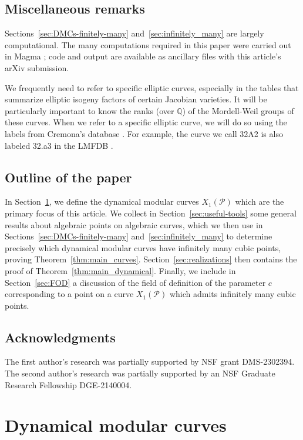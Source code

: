 \documentclass[12pt]{amsart}
\theoremstyle{definition}
\newcommand{\bbQ}{\mathbb{Q}}
\newcommand{\calP}{\mathcal{P}}
\numberwithin{equation}{section}
\begin{document}
\subsection{Miscellaneous remarks}
Sections~\ref{sec:DMCs-finitely-many} and~\ref{sec:infinitely_many} are largely computational. The many computations required in this paper were carried out in Magma \cite{magma225}; code and output are available as ancillary files with this article's arXiv submission.

We frequently need to refer to specific elliptic curves, especially in the tables that summarize elliptic isogeny factors of certain Jacobian varieties. It will be particularly important to know the ranks (over $\bbQ$) of the Mordell-Weil groups of these curves. When we refer to a specific elliptic curve, we will do so using the labels from Cremona's database \cite{cremona:1997}. For example, the curve we call 32A2 is also labeled 32.a3 in the LMFDB \cite{lmfdb}.

\subsection*{Outline of the paper}

In Section~\ref{sec:DMCs}, we define the dynamical modular curves $X_1(\calP)$ which are the primary focus of this article. We collect in Section~\ref{sec:useful-tools} some general results about algebraic points on algebraic curves, which we then use in Sections~\ref{sec:DMCs-finitely-many} and~\ref{sec:infinitely_many} to determine precisely which dynamical modular curves have infinitely many cubic points, proving Theorem~\ref{thm:main_curves}. Section~\ref{sec:realizations} then contains the proof of Theorem~\ref{thm:main_dynamical}. Finally, we include in Section~\ref{sec:FOD} a discussion of the field of definition of the parameter $c$ corresponding to a point on a curve $X_1(\calP)$ which admits infinitely many cubic points.

\subsection*{Acknowledgments}

The first author's research was partially supported by NSF grant DMS-2302394. The second author's research was partially supported by an NSF Graduate Research Fellowship DGE-2140004.

\section{Dynamical modular curves}\label{sec:DMCs}
\end{document}
